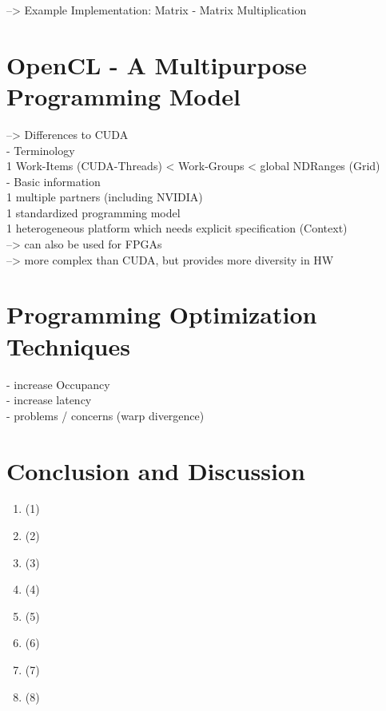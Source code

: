 \documentclass[a4paper,12pt]{llncs}
\numberwithin{equation}{section}
\begin{document}
  --> Example Implementation: Matrix - Matrix Multiplication


 
\section{OpenCL - A Multipurpose Programming Model}
  --> Differences to CUDA\\
  - Terminology\\
      1 Work-Items (CUDA-Threads) < Work-Groups < global NDRanges (Grid)\\
  - Basic information\\
      1 multiple partners (including NVIDIA)\\
      1 standardized programming model\\
      1 heterogeneous platform which needs explicit specification (Context)\\
        --> can also be used for FPGAs\\
        --> more complex than CUDA, but provides more diversity in HW\\
      



\section{Programming Optimization Techniques}
  - increase Occupancy\\
  - increase latency\\
  - problems / concerns (warp divergence)\\



\section{Conclusion and Discussion}

      


\begin{enumerate}
\item \cite{Rauber.2012} (1)
\item \cite{Lindholm.2008} (2)
\item \cite{Burgess.2020} (3)
\item \cite{Huang.2008} (4)
\item \cite{Bialas.2016} (5)
\item \cite{Khronos.2019} (6)
\item \cite{Wang.2019} (7)
\item \cite{NVIDIA.2018} (8)
\end{enumerate}





\newpage



\end{document}
